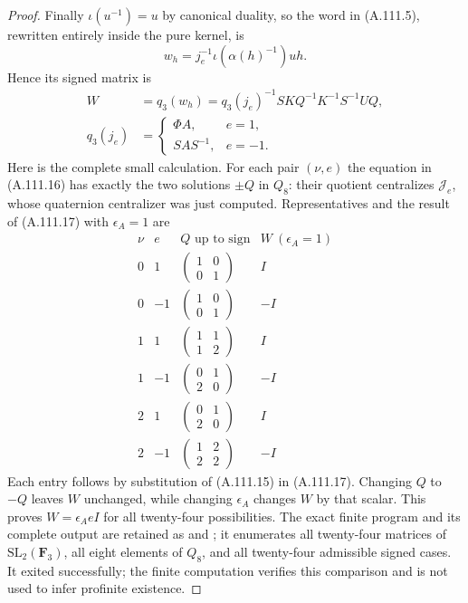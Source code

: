 \begin{proof}
Finally \(\iota(u^{-1})=u\) by canonical duality, so the word
in (A.111.5), rewritten entirely inside the pure kernel, is
\[
 w_h=j_e^{-1}\iota(\alpha(h)^{-1})u h.
\]
Hence its signed matrix is
\[
 \begin{split}
 W&=q_3(w_h)=q_3(j_e)^{-1}SKQ^{-1}K^{-1}S^{-1}UQ,\\
 q_3(j_e)&=
 \begin{cases}\Phi A,&e=1,\\ SAS^{-1},&e=-1.
 \end{cases}
 \end{split}
\tag{A.111.17}
\]
Here is the complete small calculation. For each pair \((\nu,e)\)
the equation in (A.111.16) has exactly the two solutions \(\pm Q\)
in \(Q_8\): their quotient centralizes \(\mathcal J_e\), whose
quaternion centralizer was just computed. Representatives and the
result of (A.111.17) with \(\epsilon_A=1\) are
\[
\begin{array}{c|c|c|c}
 \nu&e&Q\text{ up to sign}&W\ (\epsilon_A=1)\\\hline
 0& 1&\left(\begin{smallmatrix}1&0\\0&1\end{smallmatrix}\right)& I\\
 0&-1&\left(\begin{smallmatrix}1&0\\0&1\end{smallmatrix}\right)&-I\\
 1& 1&\left(\begin{smallmatrix}1&1\\1&2\end{smallmatrix}\right)& I\\
 1&-1&\left(\begin{smallmatrix}0&1\\2&0\end{smallmatrix}\right)&-I\\
 2& 1&\left(\begin{smallmatrix}0&1\\2&0\end{smallmatrix}\right)& I\\
 2&-1&\left(\begin{smallmatrix}1&2\\2&2\end{smallmatrix}\right)&-I
\end{array}
\tag{A.111.18}
\]
Each entry follows by substitution of (A.111.15) in (A.111.17).
Changing \(Q\) to \(-Q\) leaves \(W\) unchanged, while changing
\(\epsilon_A\) changes \(W\) by that scalar. This proves
\(W=\epsilon_A eI\) for all twenty-four possibilities.
The exact finite program and its complete output are retained as
 and
; it enumerates all
twenty-four matrices of \(\mathrm{SL}_2(\mathbf F_3)\), all eight
elements of \(Q_8\), and all twenty-four admissible signed cases.
It exited successfully; the finite computation verifies this
comparison and is not used to infer profinite existence.


\end{proof}
